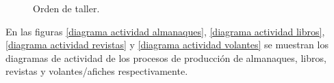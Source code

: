 \documentclass[a4paper, 12pt,twoside]{report}  %
\numberwithin{equation}{subsection} %
\begin{document}
\begin{figure}[h!]
\centering
{%
\setlength{\fboxsep}{0pt}%
\setlength{\fboxrule}{0.5pt}%
%
}%
\caption{Orden de taller.}
\label{orden taller}
\end{figure}

\indent En las figuras \ref{diagrama actividad almanaques}, \ref{diagrama actividad libros}, \ref{diagrama actividad revistas} y \ref{diagrama actividad volantes} se muestran los diagramas de actividad de los procesos de producción de almanaques, libros, revistas y volantes/afiches respectivamente.
\end{document}
